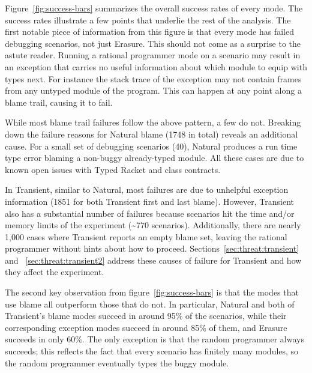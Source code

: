 
Figure~\ref{fig:success-bars} summarizes the overall success rates of
every mode.
The success rates illustrate a few points that underlie the
rest of the analysis.  The first notable piece of information from this
figure is that every mode has failed debugging scenarios, not just
Erasure. This should not come as a surprise to the astute reader.  Running
a rational programmer mode on a scenario may result in an exception
that carries no useful information about which module to equip with types next. For instance the stack trace of the exception may not
contain frames from any untyped module of the program. This can happen at any point
along a blame trail, causing it to fail.

While most blame trail failures follow the above pattern, a few do
not.  Breaking down the failure reasons for Natural blame (1748 in
total) reveals an additional cause. For a small set of debugging scenarios
(40), Natural produces a run time type error blaming a non-buggy
already-typed module. All these cases are due to known open issues with Typed
Racket and class contracts. 

In Transient, similar to Natural, most failures are due to unhelpful exception
information (1851 for both Transient first and last blame).  However, Transient
also has a substantial number of failures because scenarios hit the time and/or
memory limits of the experiment (\textasciitilde770 scenarios).  Additionally,
there are nearly 1,000 cases where Transient reports an empty blame set, leaving
the rational programmer without hints about how to proceed.
Sections~\ref{sec:threat:transient} and ~\ref{sec:threat:transient2} address
these causes of failure for Transient and how they affect the experiment.

The second key observation from figure~\ref{fig:success-bars} is that the
modes that use blame all outperform those that do not.  In particular,
Natural and both of Transient's blame modes succeed in around 95\% of the
scenarios, while their corresponding exception modes succeed in around
85\% of them, and Erasure succeeds in only 60\%.  The only
exception is that the random programmer always succeeds; this reflects the
fact that every scenario has finitely many modules, so the random programmer 
eventually types the buggy module.

